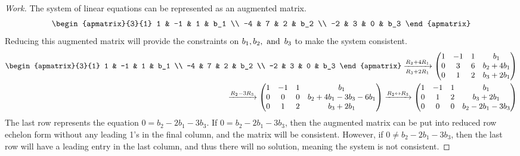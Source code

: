 \documentclass{article}
\begin{document}
\begin{proof}[Work]
  The system of linear equations can be represented as an augmented matrix.
  \[
    \begin{apmatrix}{3}{1}
      1  & -1 & 1 & b_1 \\
      -4 & 7  & 2 & b_2 \\
      -2 & 3  & 0 & b_3
    \end{apmatrix}
  \]
  Reducing this augmented matrix will provide the constraints on $b_1,b_2,\operatorname{~\text{and}~} b_3$ to make the system consistent.
  \begin{align*}
    \begin{apmatrix}{3}{1}
      1  & -1 & 1 & b_1 \\
      -4 & 7  & 2 & b_2 \\
      -2 & 3  & 0 & b_3
    \end{apmatrix} \xrightarrow[R_3 + 2R_1]{R_2 + 4R_1}
    \begin{pmatrix}
      1 & -1 & 1 & b_1        \\
      0 & 3  & 6 & b_2 + 4b_1 \\
      0 & 1  & 2 & b_3 + 2b_1
    \end{pmatrix} \\
    \xrightarrow{R_2 - 3R_3}
    \begin{pmatrix}
      1 & -1 & 1 & b_1                    \\
      0 & 0  & 0 & b_2 + 4b_1 -3b_3 -6b_1 \\
      0 & 1  & 2 & b_3 + 2b_1
    \end{pmatrix} \xrightarrow{R_2 \leftrightarrow R_3}
    \begin{pmatrix}
      1 & -1 & 1 & b_1               \\
      0 & 1  & 2 & b_3 + 2b_1        \\
      0 & 0  & 0 & b_2 - 2b_1 - 3b_3
    \end{pmatrix}
  \end{align*}
  The last row represents the equation $0 = b_2 - 2b_1 - 3b_3$. If $0 = b_2 - 2b_1 - 3b_3$, then the augmented matrix can be put into reduced row echelon form without any leading 1's in the final column, and the matrix will be consistent. However, if $0 \neq b_2 - 2b_1 - 3b_3$, then the last row will have a leading entry in the last column, and thus there will no solution, meaning the system is not consistent.
\end{proof}
\qdash
\end{document}
